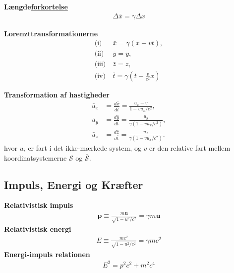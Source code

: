 \documentclass[a4paper]{article}
\begin{document}
    \textbf{Længde\underline{forkortelse}}\begin{align*}
        \Delta \overline{x} = \gamma \Delta x \tag{12.9}
    \end{align*} 

    \textbf{Lorenzttransformationerne} 
    \begin{align*}
        \text{(i)} \ & \bar{x} = \gamma (x - vt), \tag{12.18}\\
        \text{(ii)} \ & \bar{y} = y, \\
        \text{(iii)} \ & \bar{z} = z, \\
        \text{(iv)} \ & \bar{t} = \gamma \left( t - \frac{v}{c^2} x \right)
    \end{align*}

    \textbf{Transformation af hastigheder} 
    \begin{align*}
        \bar{u}_x &= \frac{d\bar{x}}{d\bar{t}} = \frac{u_x - v}{1 - vu_x / c^2}, \\
        \bar{u}_y &= \frac{d\bar{y}}{d\bar{t}} = \frac{u_y}{\gamma \left( 1 - vu_x / c^2 \right)}, \\
        \bar{u}_z &= \frac{d\bar{z}}{d\bar{t}} = \frac{u_z}{\gamma \left( 1 - vu_x / c^2 \right)}.
    \end{align*}
    hvor \(u_i\) er fart i det ikke-mærkede system, og \(v\) er den relative fart mellem koordinatsystemerne \(\mathcal{S} \) og \(\overline{\mathcal{S}}\).
    \subsection{Impuls, Energi og Kræfter}
    \textbf{Relativistisk impuls}
    \begin{align*}
        \boxed{\mathbf{p} \equiv \frac{m \mathbf{u}}{\sqrt{1 - u^{2} /c^{2} } } = \gamma m \mathbf{u}} \tag{12.47}
    \end{align*} 
    \textbf{Relativistisk energi}
    \begin{align*}
       \boxed{E \equiv \frac{mc^{2} }{\sqrt{1 - u^{2} /c ^{2} }}  = \gamma m c^{2}} \tag{12.50}
    \end{align*} 
    \textbf{Energi-impuls relationen}\begin{align*}
        \boxed{E^{2} = p^{2} c^{2} + m^{2} c^4} \tag{12.55}
    \end{align*} 
\end{document}
